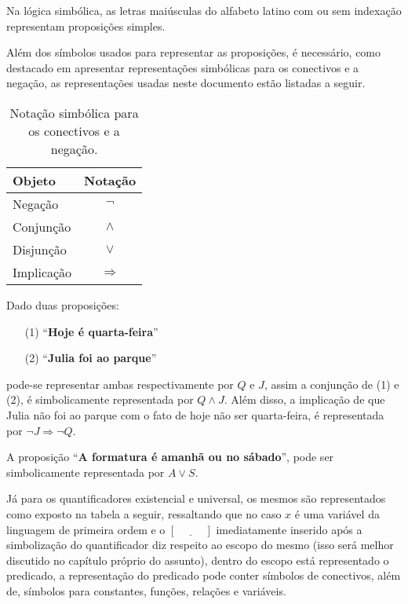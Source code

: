 \begin{definicao}\label{def:SimbolosProposicionais}
	Na lógica simbólica, as letras maiúsculas do alfabeto latino com ou sem indexação representam proposições simples.
\end{definicao}

Além dos símbolos usados para representar as proposições, é necessário, como destacado em \cite{leonidas2002} apresentar representações simbólicas para os conectivos e a negação, as representações usadas neste documento estão listadas a seguir.


\begin{table}[h]
	\centering
	\begin{tabular}{lc}
		\hline
		\textbf{Objeto} & \textbf{Notação}\\
		\hline
		Negação & $\neg$\\
		Conjunção & $\land$\\
		Disjunção & $\lor$\\
		Implicação & $\Rightarrow$\\
		\hline
	\end{tabular}
	\caption{Notação simbólica para os conectivos e a negação.}
\end{table}

\begin{exemplo}\label{exe:RepresentacaoSimbolica1}
	Dado duas proposições:
	\begin{itemize}
		\item[(1)] ``\textbf{Hoje é quarta-feira}''
		\item[(2)] ``\textbf{Julia foi ao parque}''
	\end{itemize}
	pode-se representar ambas respectivamente por $Q$ e $J$, assim a conjunção de (1) e (2), é simbolicamente representada por $Q \land J$. Além disso, a implicação de que Julia não foi ao parque com o fato de hoje não ser quarta-feira, é representada por $\neg J \Rightarrow \neg Q$.
\end{exemplo}

\begin{exemplo}\label{exe:RepresentacaoSimbolica2}
	A proposição ``\textbf{A formatura é amanhã ou no sábado}'', pode ser simbolicamente representada por $A \lor S$.
\end{exemplo}

Já para os quantificadores existencial e universal, os mesmos são representados como exposto na tabela a seguir, ressaltando que no caso $x$ é uma variável da linguagem de primeira ordem e o $[\underline{ \ \ \ \ \ \ \ \ \ \ \ \ }]$ imediatamente inserido após a simbolização do quantificador diz respeito ao escopo do mesmo (isso será melhor discutido no capítulo próprio do assunto), dentro do escopo está representado o predicado, a representação do predicado pode conter símbolos de conectivos, além de, símbolos para constantes, funções, relações e variáveis.

